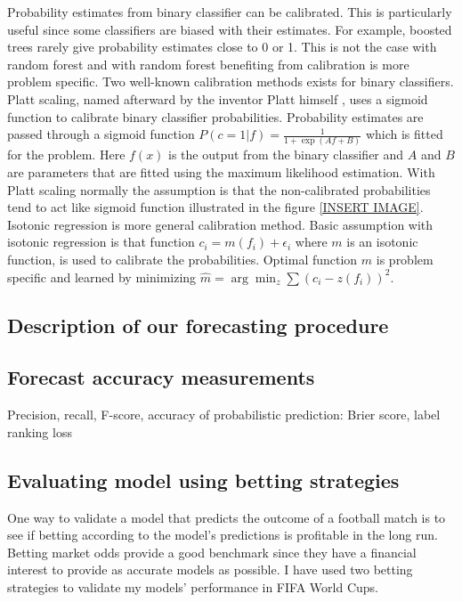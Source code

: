 Probability estimates from binary classifier can be calibrated. This is particularly useful since some classifiers are biased with their estimates. For example, boosted trees rarely give probability estimates close to 0 or 1. This is not the case with random forest and with random forest benefiting from calibration is more problem specific. \cite{niculescu2005predicting} Two well-known calibration methods exists for binary classifiers. Platt scaling, named afterward by the inventor Platt himself \cite{platt1999probabilistic}, uses a sigmoid function to calibrate binary classifier probabilities. Probability estimates are passed through a sigmoid function $P ( c = 1 | f ) = \frac { 1 } { 1 + \exp ( A f + B ) }$ which is fitted for the problem. Here $f(x)$ is the output from the binary classifier and $A$ and $B$ are parameters that are fitted using the maximum likelihood estimation. With Platt scaling normally the assumption is that the non-calibrated probabilities tend to act like sigmoid function illustrated in the figure \ref{INSERT IMAGE}. Isotonic regression is more general calibration method. Basic assumption with isotonic regression is that function $c _ { i } = m \left( f _ { i } \right) + \epsilon _ { i }$ where $m$ is an isotonic function, is used to calibrate the probabilities. Optimal function $m$ is problem specific and learned by minimizing $\hat { m } = \arg \min _ { z } \sum \left( c _ { i } - z \left( f _ { i } \right) \right) ^ { 2 }$. \cite{zadrozny2002transforming}




\subsection{Description of our forecasting procedure}
\subsection{Forecast accuracy measurements}
Precision, recall, F-score, accuracy of probabilistic prediction: Brier score, label ranking loss
\subsection{Evaluating model using betting strategies}
One way to validate a model that predicts the outcome of a football match is to see if betting according to the model's predictions is profitable in the long run.  Betting market odds provide a good benchmark since they have a financial interest to provide as accurate models as possible. I have used two betting strategies to validate my models' performance in FIFA World Cups.

